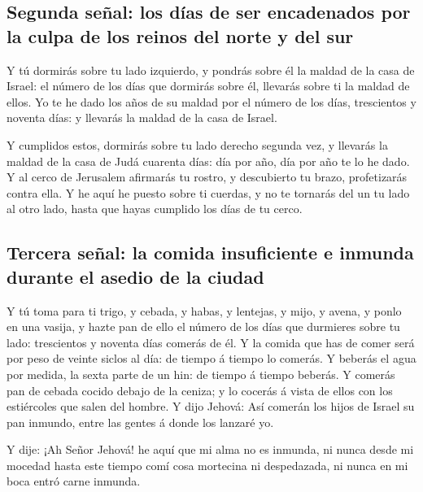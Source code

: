 \hypertarget{segunda-seuxf1al-los-duxedas-de-ser-encadenados-por-la-culpa-de-los-reinos-del-norte-y-del-sur}{%
\subsection{Segunda señal: los días de ser encadenados por la culpa de
los reinos del norte y del
sur}\label{segunda-seuxf1al-los-duxedas-de-ser-encadenados-por-la-culpa-de-los-reinos-del-norte-y-del-sur}}

 Y tú dormirás sobre tu lado izquierdo, y pondrás sobre él
la maldad de la casa de Israel: el número de los días que dormirás sobre
él, llevarás sobre ti la maldad de ellos.  Yo te he dado los
años de su maldad por el número de los días, trescientos y noventa días:
y llevarás la maldad de la casa de Israel.

 Y cumplidos estos, dormirás sobre tu lado derecho segunda
vez, y llevarás la maldad de la casa de Judá cuarenta días: día por año,
día por año te lo he dado.  Y al cerco de Jerusalem
afirmarás tu rostro, y descubierto tu brazo, profetizarás contra ella.
 Y he aquí he puesto sobre ti cuerdas, y no te tornarás del
un tu lado al otro lado, hasta que hayas cumplido los días de tu cerco.

\hypertarget{tercera-seuxf1al-la-comida-insuficiente-e-inmunda-durante-el-asedio-de-la-ciudad}{%
\subsection{Tercera señal: la comida insuficiente e inmunda durante el
asedio de la
ciudad}\label{tercera-seuxf1al-la-comida-insuficiente-e-inmunda-durante-el-asedio-de-la-ciudad}}

 Y tú toma para ti trigo, y cebada, y habas, y lentejas, y
mijo, y avena, y ponlo en una vasija, y hazte pan de ello el número de
los días que durmieres sobre tu lado: trescientos y noventa días comerás
de él.  Y la comida que has de comer será por peso de
veinte siclos al día: de tiempo á tiempo lo comerás.  Y
beberás el agua por medida, la sexta parte de un hin: de tiempo á tiempo
beberás.  Y comerás pan de cebada cocido debajo de la
ceniza; y lo cocerás á vista de ellos con los estiércoles que salen del
hombre.  Y dijo Jehová: Así comerán los hijos de Israel su
pan inmundo, entre las gentes á donde los lanzaré yo.

 Y dije: ¡Ah Señor Jehová! he aquí que mi alma no es
inmunda, ni nunca desde mi mocedad hasta este tiempo comí cosa mortecina
ni despedazada, ni nunca en mi boca entró carne inmunda.

